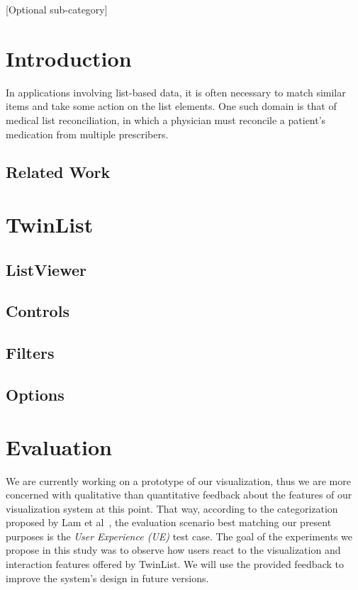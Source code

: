 \documentclass{chi2009}
\begin{document}

[Optional sub-category]

\section{Introduction}
In applications involving list-based data, it is often necessary to match similar items and take some action on the list elements. One such domain is that of medical list reconciliation, in which a physician must reconcile a patient's medication from multiple prescribers.

\subsection{Related Work}

\section{TwinList}

\subsection{ListViewer}

\subsection{Controls}

\subsection{Filters}

\subsection{Options}

\section{Evaluation}

We are currently working on a prototype of our visualization, thus we are more concerned with qualitative than quantitative feedback about the features of our visualization system at this point. That way, according to the categorization proposed by Lam et al~\cite{lam-bertini-isenberg-plaisant-carpendale-2011}, the evaluation scenario best matching our present purposes is the \textit{User Experience (UE)} test case. The goal of the experiments we propose in this study was to observe how users react to the visualization and interaction features offered by TwinList. We will use the provided feedback to improve the system's design in future versions. 
\end{document}
